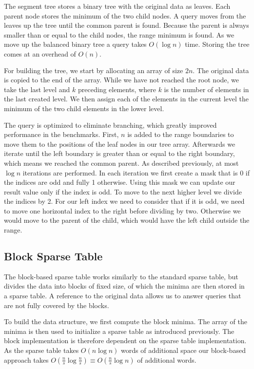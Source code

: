 \documentclass[a4paper,UKenglish,cleveref,thm-restate]{lipics-v2021}
\begin{document}
The segment tree stores a binary tree with the original data as leaves. Each parent node 
stores the minimum of the two child nodes. A query moves from the leaves up the tree until 
the common parent is found. Because the parent is always smaller than or equal to the child nodes,
the range minimum is found. As we move up the balanced binary tree a query takes $O(\log{n})$ time.
Storing the tree comes at an overhead of $O(n)$. 

For building the tree, we start by allocating an array of size $2n$. The original data is copied 
to the end of the array. While we have not reached the root node, we take the last level and 
$k$ preceding elements, where $k$ is the number of elements in the last created level. 
We then assign each of the elements in the current level the minimum of the two child elements in 
the lower level. 

The query is optimized to eliminate branching, which greatly improved performance in the 
benchmarks. First, $n$ is added to the range boundaries to move them to the positions of the leaf 
nodes in our tree array. Afterwards we iterate until the left boundary is greater than or equal to the right boundary, 
which means we reached the common parent. As described previously, at most $\log{n}$ iterations are performed. 
In each iteration we first create a mask that is 0 if the indices are odd and fully 1 otherwise. Using this mask 
we can update our result value only if the index is odd. To move to the next higher level we divide the indices by 2.
For our left index we need to consider that if it is odd, we need to move one horizontal index to the right before 
dividing by two. Otherwise we would move to the parent of the child, which would have the left child outside the 
range.  

\subsection{Block Sparse Table}

The block-based sparse table works similarly to the standard sparse table, but 
divides the data into blocks of fixed size, of which the minima are then stored in a 
sparse table. A reference to the original data allows us to answer queries that are not fully covered by the blocks. 

To build the data structure, we first compute the block minima. The array of the minima is then 
used to initialize a sparse table as introduced previously. The block implementation is therefore 
dependent on the sparse table implementation. As the sparse table takes $O(n\log{n})$ words of 
additional space our block-based approach takes $O(\frac{n}{s}\log{\frac{n}{s}})\equiv O(\frac{n}{s}\log{n})$ 
of additional words.
\end{document}
